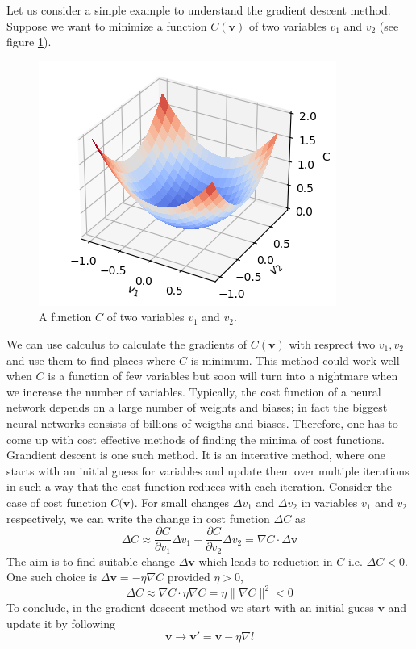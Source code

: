 Let us consider a simple example to understand the gradient descent method. Suppose we want to minimize a function $C(\mathbf{v})$ of two variables $v_1$ and $v_2$ (see figure \ref{fig:cost_f}).
\begin{figure}[htbp]
    \centering
    \includegraphics[width=.4\textwidth]{Figures/cost_func.png}
    \caption{A function $C$ of two variables $v_1$ and $v_2$.}
    \label{fig:cost_f}
\end{figure} 
We can use calculus to calculate the gradients of $C(\mathbf{v})$ with resprect two $v_1, v_2$ and use them to find places where $C$ is minimum. This method could work well when 
$C$ is a function of few variables but soon will turn into a nightmare when we increase the number of variables. Typically, the cost function of a neural network depends on a large number of
weights and biases; in fact the biggest neural networks consists of billions of weigths and biases. Therefore, one has to come up with cost effective 
methods of finding the minima of cost functions. Grandient descent is one such method. It is an interative method, where one starts 
with an initial guess for variables and update them over multiple iterations in such a 
way that the cost function reduces with each iteration. Consider the case of cost function $C(\mathbf{v}$). For small changes $\Delta v_1$ and  $\Delta v_2$ in variables $v_1$ and 
$v_2$ respectively, we can write the change in cost function $\Delta C$ as
\begin{equation}
    \label{eq:del_C}
    \Delta C \approx \frac{\partial C}{\partial v_1}\Delta v_1 + \frac{\partial C}{\partial v_2} \Delta v_2 = \nabla C \cdot \Delta \mathbf{v}
\end{equation}
The aim is to find suitable change $\Delta \mathbf{v}$ which leads to reduction in $C$ i.e. $\Delta C < 0$. One such choice is $\Delta \mathbf{v} = -\eta \nabla C$ provided $\eta > 0$,
$$\Delta C \approx \nabla C \cdot \eta \nabla C = \eta \|\nabla C\|^2 < 0 $$
To conclude, in the gradient descent method we start with an initial guess $\mathbf{v}$ and update it by following
 $$\mathbf{v} \rightarrow \mathbf{v}' = \mathbf{v} - \eta \nabla l$$
